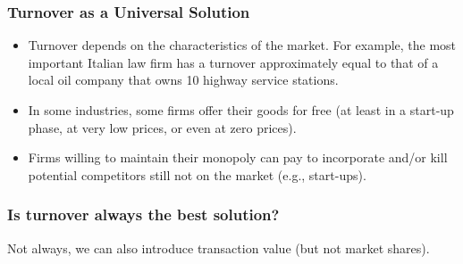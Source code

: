     \subsubsection{Turnover as a Universal Solution}

        \begin{itemize}
            \item Turnover depends on the characteristics of the market. For example, the most important Italian law firm has a turnover approximately equal to that of a local oil company that owns 10 highway service stations.
        
            \item In some industries, some firms offer their goods for free (at least in a start-up phase, at very low prices, or even at zero prices). 

        
            \item Firms willing to maintain their monopoly can pay to incorporate and/or kill potential competitors still not on the market (e.g., start-ups).
            

        \end{itemize}
        

\newpage
        \subsubsection*{Is turnover always the best solution?}
        
        Not always, we can also introduce transaction value (but not market shares).

